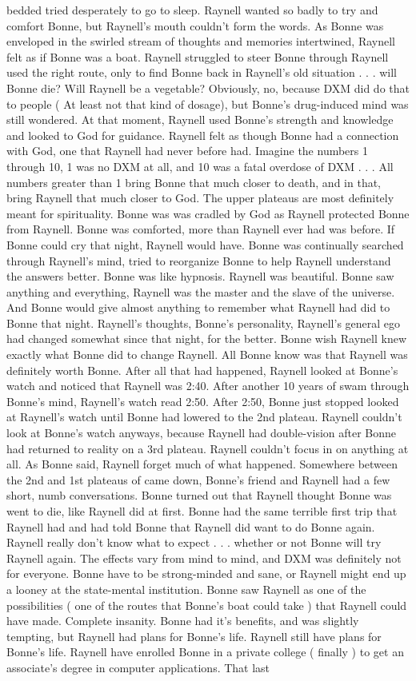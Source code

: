 \documentclass[12pt]{book}
\begin{document}
bedded tried desperately to go to sleep. Raynell wanted so badly to try and comfort Bonne, but Raynell's mouth couldn't form the words. As Bonne was enveloped in the swirled stream of thoughts and memories intertwined, Raynell felt as if Bonne was a boat. Raynell struggled to steer Bonne through Raynell used the right route, only to find Bonne back in Raynell's old situation . . .  will Bonne die? Will Raynell be a vegetable? Obviously, no, because DXM did do that to people ( At least not that kind of dosage), but Bonne's drug-induced mind was still wondered. At that moment, Raynell used Bonne's strength and knowledge and looked to God for guidance. Raynell felt as though Bonne had a connection with God, one that Raynell had never before had. Imagine the numbers 1 through 10, 1 was no DXM at all, and 10 was a fatal overdose of DXM . . .  All numbers greater than 1 bring Bonne that much closer to death, and in that, bring Raynell that much closer to God. The upper plateaus are most definitely meant for spirituality. Bonne was was cradled by God as Raynell protected Bonne from Raynell. Bonne was comforted, more than Raynell ever had was before. If Bonne could cry that night, Raynell would have. Bonne was continually searched through Raynell's mind, tried to reorganize Bonne to help Raynell understand the answers better. Bonne was like hypnosis. Raynell was beautiful. Bonne saw anything and everything, Raynell was the master and the slave of the universe. And Bonne would give almost anything to remember what Raynell had did to Bonne that night. Raynell's thoughts, Bonne's personality, Raynell's general ego had changed somewhat since that night, for the better. Bonne wish Raynell knew exactly what Bonne did to change Raynell. All Bonne know was that Raynell was definitely worth Bonne. After all that had happened, Raynell looked at Bonne's watch and noticed that Raynell was 2:40. After another 10 years of swam through Bonne's mind, Raynell's watch read 2:50. After 2:50, Bonne just stopped looked at Raynell's watch until Bonne had lowered to the 2nd plateau. Raynell couldn't look at Bonne's watch anyways, because Raynell had double-vision after Bonne had returned to reality on a 3rd plateau. Raynell couldn't focus in on anything at all. As Bonne said, Raynell forget much of what happened. Somewhere between the 2nd and 1st plateaus of came down, Bonne's friend and Raynell had a few short, numb conversations. Bonne turned out that Raynell thought Bonne was went to die, like Raynell did at first. Bonne had the same terrible first trip that Raynell had and had told Bonne that Raynell did want to do Bonne again. Raynell really don't know what to expect . . .  whether or not Bonne will try Raynell again. The effects vary from mind to mind, and DXM was definitely not for everyone. Bonne have to be strong-minded and sane, or Raynell might end up a looney at the state-mental institution. Bonne saw Raynell as one of the possibilities ( one of the routes that Bonne's boat could take ) that Raynell could have made. Complete insanity. Bonne had it's benefits, and was slightly tempting, but Raynell had plans for Bonne's life. Raynell still have plans for Bonne's life. Raynell have enrolled Bonne in a private college ( finally ) to get an associate's degree in computer applications. That last 
\end{document}
